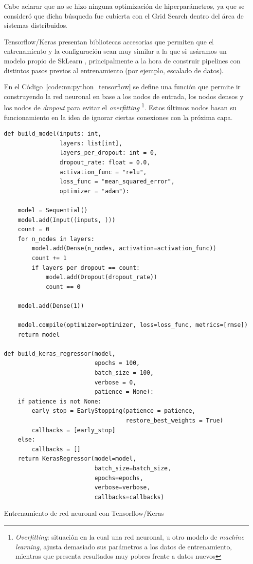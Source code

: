 \documentclass[11pt]{article}
\newcommand{\english}[1]{\textit{#1}}
\begin{document}
Cabe aclarar que no se hizo ninguna optimización de hiperparámetros, ya que se consideró que dicha búsqueda fue cubierta con el Grid Search dentro del área de sistemas distribuidos.

Tensorflow/Keras presentan bibliotecas accesorias que permiten que el entrenamiento y la configuración sean muy similar a la que si usáramos un modelo propio de SkLearn \cite{python:lib:scikitlearn}, principalmente a la hora de construir pipelines con distintos pasos previos al entrenamiento (por ejemplo, escalado de datos).

En el Código~\ref{code:nn:python_tensorflow} se define una función que permite ir construyendo la red neuronal en base a los nodos de entrada, los nodos densos y los nodos de \english{dropout} para evitar el \english{overfitting} \footnote{\english{Overfitting}: situación en la cual una red neuronal, u otro modelo de \english{machine learning}, ajusta demasiado sus parámetros a los datos de entrenamiento, mientras que presenta resultados muy pobres frente a datos nuevos}. Estos últimos nodos basan su funcionamiento en la idea de ignorar ciertas conexiones con la próxima capa.

\begin{listing}
\begin{verbatim}
def build_model(inputs: int,
                layers: list[int],
                layers_per_dropout: int = 0,
                dropout_rate: float = 0.0,
                activation_func = "relu",
                loss_func = "mean_squared_error",
                optimizer = "adam"):
    
    model = Sequential()
    model.add(Input((inputs, )))
    count = 0
    for n_nodes in layers:
        model.add(Dense(n_nodes, activation=activation_func))
        count += 1
        if layers_per_dropout == count:
            model.add(Dropout(dropout_rate))
            count == 0

    model.add(Dense(1))
    
    model.compile(optimizer=optimizer, loss=loss_func, metrics=[rmse])
    return model

def build_keras_regressor(model,
                          epochs = 100,
                          batch_size = 100,
                          verbose = 0,
                          patience = None):
    if patience is not None:
        early_stop = EarlyStopping(patience = patience,
                                   restore_best_weights = True)
        callbacks = [early_stop]
    else:
        callbacks = []
    return KerasRegressor(model=model,
                          batch_size=batch_size,
                          epochs=epochs,
                          verbose=verbose,
                          callbacks=callbacks)
\end{verbatim}
\caption{Entrenamiento de red neuronal con Tensorflow/Keras}
\label{code:nn:python_tensorflow}
\end{listing}
\end{document}
